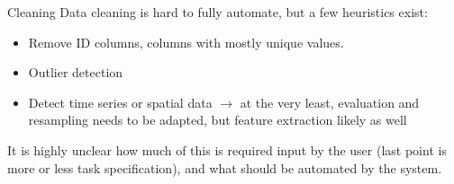 \begin{frame}{Cleaning}
  Data cleaning is hard to fully automate, but a few heuristics exist:
  \begin{itemize}
    \item Remove ID columns, columns with mostly unique values.
    \item Outlier detection 
    \item Detect time series or spatial data $\rightarrow$ 
        at the very least, evaluation and resampling needs to be adapted,
        but feature extraction likely as well
  \end{itemize}

  \vspace{1cm}

  It is highly unclear how much of this is required input by the user
  (last point is more or less task specification),
  and what should be automated by the system. 

\end{frame}

